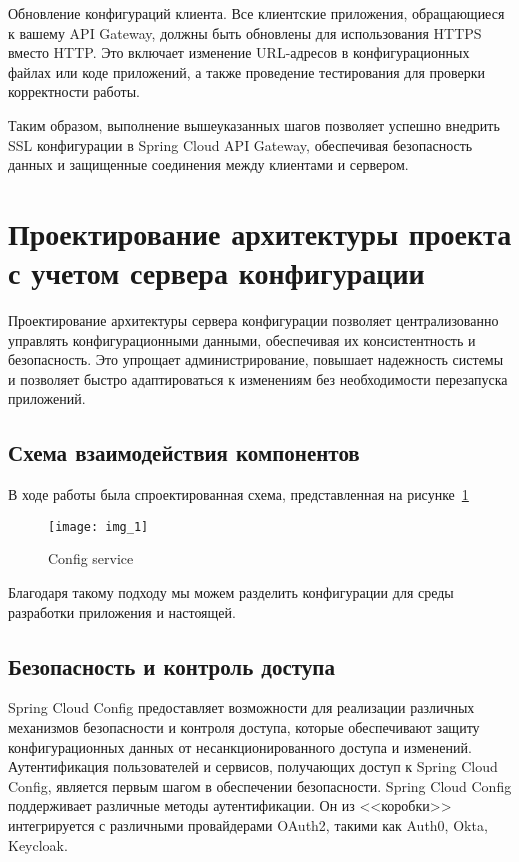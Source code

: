 Обновление конфигураций клиента.
Все клиентские приложения, обращающиеся к вашему API Gateway, должны быть обновлены для использования HTTPS вместо HTTP. Это включает изменение URL-адресов в конфигурационных файлах или коде приложений, а также проведение тестирования для проверки корректности работы.

Таким образом, выполнение вышеуказанных шагов позволяет успешно внедрить SSL конфигурации в Spring Cloud API Gateway, обеспечивая безопасность данных и защищенные соединения между клиентами и сервером.


\section{Проектирование архитектуры проекта с учетом сервера конфигурации}

Проектирование архитектуры сервера конфигурации позволяет централизованно управлять конфигурационными данными,
обеспечивая их консистентность и безопасность.
Это упрощает администрирование, повышает надежность системы и позволяет
быстро адаптироваться к изменениям без необходимости перезапуска приложений.

\subsection{Схема взаимодействия компонентов}

В ходе работы была спроектированная схема, представленная на рисунке~\ref{fig:config}

\begin{figure}[htbp]
    \centering
    \texttt{[image: img\_1]}
    \caption{Config service}
    \label{fig:config}
\end{figure}

Благодаря такому подходу мы можем разделить конфигурации для
среды разработки приложения и настоящей.

\subsection{Безопасность и контроль доступа}

Spring Cloud Config предоставляет возможности для реализации различных механизмов безопасности и контроля доступа,
которые обеспечивают защиту конфигурационных данных от несанкционированного доступа и изменений.
Аутентификация пользователей и сервисов, получающих доступ к Spring Cloud Config, является первым шагом в обеспечении
безопасности.
Spring Cloud Config поддерживает различные методы аутентификации.
Он из <<коробки>> интегрируется с различными провайдерами OAuth2, такими как Auth0, Okta, Keycloak.

